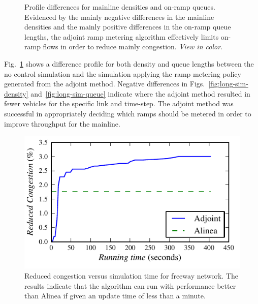 \begin{figure}[h]
\centering%
\hfill%
%
\caption[Profile differences for mainline densities and on-ramp queues for controlled vs. uncontrolled instances.]{Profile differences for mainline densities and on-ramp queues. Evidenced
	by the mainly negative differences in the mainline densities and the
	mainly positive differences in the on-ramp queue lengths, the adjoint
	ramp metering algorithm effectively limits on-ramp flows in order to
	reduce mainly congestion. \textit{View in color.}\label{fig:long-sim}}
\end{figure}			

Fig.~\ref{fig:long-sim} shows a difference profile for both density and queue lengths between the
no control simulation and the simulation applying the ramp metering
policy generated from the adjoint method. Negative differences in
Figs.~\ref{fig:long-sim-density} and~\ref{fig:long-sim-queue}
indicate where the adjoint method resulted in fewer vehicles for the
specific link and time-step. The adjoint method was successful in
appropriately deciding which ramps should be metered in order to improve
throughput for the mainline.

\begin{figure}[h]
\centering%
\includegraphics[width=0.45\columnwidth]{previous-articles/adjoint/images/longsim}%
\caption{Reduced congestion versus simulation time for freeway network. The results indicate that the algorithm can run with performance better than Alinea if given an update time of less than a minute.}%
\label{fig:running-time}%
\end{figure}
								
